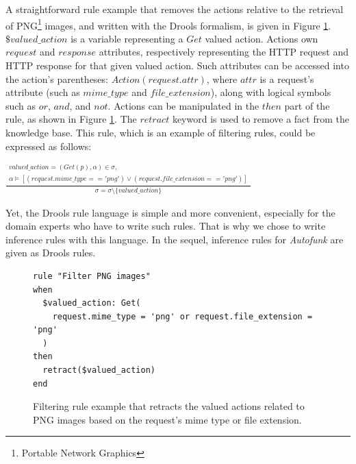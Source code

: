 A straightforward rule example that removes the actions relative
to the retrieval of PNG\footnote{Portable Network Graphics}
images, and written with the Drools formalism, is given in Figure
\ref{fig:layer1:filter}.  $\$valued\_action$ is a variable
representing a $Get$ valued action.  Actions own $request$ and
$response$ attributes, respectively representing the HTTP request
and HTTP response for that given valued action. Such attributes
can be accessed into the action's parentheses:
$Action(request.attr)$, where $attr$ is a request's attribute
(such as $mime\_type$ and $file\_extension$), along with logical
symbols such as $or$, $and$, and $not$. Actions can be
manipulated in the $then$ part of the rule, as shown in Figure
\ref{fig:layer1:filter}. The $retract$ keyword is used to remove
a fact from the knowledge base. This rule, which is an example of
filtering rules, could be expressed as follows:

\begin{center}
$\frac{
    \begin{matrix}
        valued\_action = (Get(p), \alpha) \in \sigma,\\\alpha
        \models [ (request.mime\_type == 'png') \vee
        (request.file\_extension == 'png') ]
    \end{matrix}
}{
    \begin{matrix}
        \sigma = \sigma \setminus \{ valued\_action \}
    \end{matrix}
}$
\end{center}

Yet, the Drools rule language is simple and more convenient,
especially for the domain experts who have to write such rules.
That is why we chose to write inference rules with this language.
In the sequel, inference rules for \emph{Autofunk} are given as
Drools rules.

\begin{figure}[ht]
\begin{framed}
\begin{BVerbatim}
rule "Filter PNG images"
when
  $valued_action: Get(
    request.mime_type = 'png' or request.file_extension = 'png'
  )
then
  retract($valued_action)
end
\end{BVerbatim}
\end{framed}

    \caption{Filtering rule example that retracts the valued actions
    related to PNG images based on the request's mime type or
    file extension.}
    \label{fig:layer1:filter}
\end{figure}

